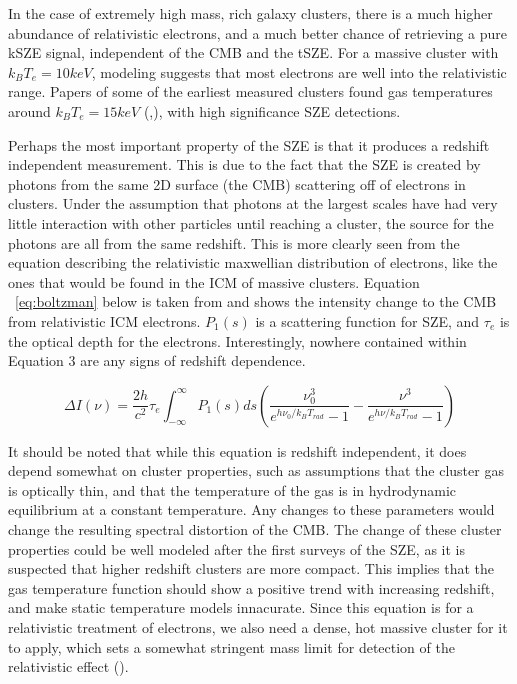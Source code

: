\documentclass[manuscript]{aastex}
\begin{document}
In the case of extremely high mass, rich galaxy clusters, there is a much higher abundance of relativistic electrons, and a much better chance of retrieving a pure kSZE signal, independent of the CMB and the tSZE. For a massive cluster with \(k_{B}T_{e} = 10 keV\), modeling suggests that most electrons are well into the relativistic range. Papers of some of the earliest measured clusters found gas temperatures around \(k_{B}T_{e} = 15 keV\) (\cite{Mushotzky1997},\cite{Allen1998}), with high significance SZE detections.

Perhaps the most important property of the SZE is that it produces a redshift independent measurement. This is due to the fact that the SZE is created by photons from the same 2D surface (the CMB) scattering off of electrons in clusters. Under the assumption that photons at the largest scales have had very little interaction with other particles until reaching a cluster, the source for the photons are all from the same redshift. This is more clearly seen from the equation describing the relativistic maxwellian distribution of electrons, like the ones that would be found in the ICM of massive clusters. Equation ~\ref{eq:boltzman} below is taken from \cite{Birkinshaw1999} and shows the intensity change to the CMB from relativistic ICM electrons. \(P_{1}(s)\) is a scattering function for SZE,  and \(\tau_{e}\) is the optical depth for the electrons. Interestingly, nowhere contained within Equation 3 are any signs of redshift dependence.

\begin{equation}\label{eq:boltzman}
\Delta I(\nu) = \frac{2h}{c^{2}}\tau_{e} \int_{-\infty}^{\infty} P_{1}(s) ds (\frac{\nu_{0}^{3}}{e^{h\nu_{0}/k_{B}T_{rad}}-1}  - \frac{\nu^{3}}{e^{h\nu/k_{B}T_{rad}}-1})
\end{equation}

It should be noted that while this equation is redshift independent, it does depend somewhat on cluster properties, such as assumptions that the cluster gas is optically thin, and that the temperature of the gas is in hydrodynamic equilibrium at a constant temperature. Any changes to these parameters would change the resulting spectral distortion of the CMB. The change of these cluster properties could be well modeled after the first surveys of the SZE, as it is suspected that higher redshift clusters are more compact. This implies that the gas temperature function should show a positive trend with increasing redshift, and make static temperature models innacurate. Since this equation is for a relativistic treatment of electrons, we also need a dense, hot massive cluster for it to apply, which sets a somewhat stringent mass limit for detection of the relativistic effect (\cite{Carlstrom2002}).
\end{document}
